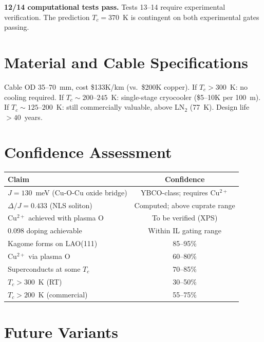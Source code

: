 \documentclass[11pt, a4paper]{article}
\begin{document}
\textbf{12/14 computational tests pass.} Tests 13--14 require
experimental verification. The prediction $T_c = 370$~K is
contingent on both experimental gates passing.

\section{Material and Cable Specifications}

Cable OD 35--70~mm, cost \$133K/km (vs.\ \$200K copper). If
$T_c > 300$~K: no cooling required. If $T_c \sim 200$--$245$~K:
single-stage cryocooler (\$5--10K per 100~m). If
$T_c \sim 125$--$200$~K: still commercially valuable, above
LN$_2$ (77~K). Design life $> 40$~years.

\section{Confidence Assessment}

\begin{center}
\begin{tabular}{@{}lc@{}}
\toprule
\textbf{Claim} & \textbf{Confidence} \\
\midrule
$J = 130$~meV (Cu-O-Cu oxide bridge) & YBCO-class; requires
  Cu$^{2+}$ \\
$\Delta/J = 0.433$ (NLS soliton) & Computed; above cuprate
  range \\
Cu$^{2+}$ achieved with plasma O & \textcolor{nm-orange}{To be
  verified (XPS)} \\
0.098 doping achievable & Within IL gating range \\
\midrule
Kagome forms on LAO(111) & 85--95\% \\
Cu$^{2+}$ via plasma O & 60--80\% \\
Superconducts at some $T_c$ & 70--85\% \\
$T_c > 300$~K (RT) & 30--50\% \\
$T_c > 200$~K (commercial) & 55--75\% \\
\bottomrule
\end{tabular}
\end{center}

\section{Future Variants}
\end{document}
